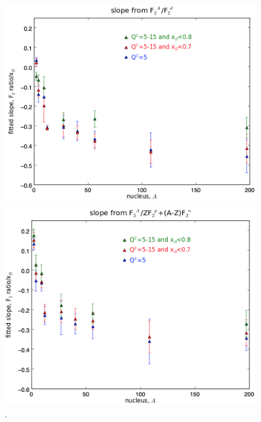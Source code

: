 \documentclass[oneside]{article}
\begin{document}
\begin{figure}[H]
\begin{minipage}{0.5\textwidth}
 \includegraphics[width=\textwidth]{plots/plotsvA/Aslope_ad.png}
\end{minipage}\hfill\begin{minipage}{0.5\textwidth}
\includegraphics[width=\textwidth]{plots/plotsvA/Aslope_free.png}
\end{minipage}
  \caption[]{.}
  \label{fig:Aslope_compare}
\end{figure}   
\end{document}
